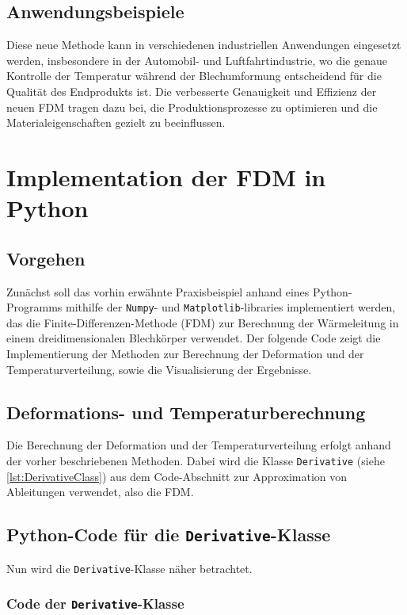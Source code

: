 \subsection{Anwendungsbeispiele}

Diese neue Methode kann in verschiedenen industriellen Anwendungen eingesetzt werden, insbesondere in der Automobil- und Luftfahrtindustrie, wo die genaue Kontrolle der Temperatur während der Blechumformung entscheidend für die Qualität des Endprodukts ist. Die verbesserte Genauigkeit und Effizienz der neuen FDM tragen dazu bei, die Produktionsprozesse zu optimieren und die Materialeigenschaften gezielt zu beeinflussen.

\section{Implementation der FDM in Python}

\subsection{Vorgehen}
\label{sec:ImplFDM}

Zunächst soll das vorhin erwähnte Praxisbeispiel anhand eines Python-Programms mithilfe der \texttt{Numpy}- und \texttt{Matplotlib}-libraries implementiert werden, das die Finite-Differenzen-Methode (FDM) zur Berechnung der Wärmeleitung in einem dreidimensionalen Blechkörper verwendet. Der folgende Code zeigt die Implementierung der Methoden zur Berechnung der Deformation und der Temperaturverteilung, sowie die Visualisierung der Ergebnisse.

\subsection{Deformations- und Temperaturberechnung}

Die Berechnung der Deformation und der Temperaturverteilung erfolgt anhand der vorher beschriebenen Methoden. Dabei wird die Klasse \texttt{Derivative} (siehe \ref{lst:DerivativeClass}) aus dem Code-Abschnitt zur Approximation von Ableitungen verwendet, also die FDM.

\subsection{Python-Code für die \texttt{Derivative}-Klasse}
Nun wird die \texttt{Derivative}-Klasse näher betrachtet.

\subsubsection{Code der \texttt{Derivative}-Klasse}


